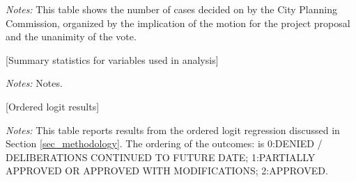 \documentclass[12pt,english,hyperfootnotes=false,hidelinks]{article}
\begin{document}
\begin{table}[H]
\caption{Summary of Motion Outcomes and Vote Results}
\vspace{0.2cm}
\label{tab_result_unanimity}
\begin{adjustbox}{max width=\textwidth}
\begin{threeparttable}

\begin{tablenotes}

\item {\textit{Notes: } This table shows the number of cases decided on by the City Planning Commission, organized by the implication of the motion for the project proposal and the unanimity of the vote.}
\end{tablenotes}
\end{threeparttable}
\end{adjustbox}
\end{table}

\pagebreak

\begin{table}[H]
\caption{Summary Statistics for Case Features}
\vspace{0.2cm}
\label{tab_summary_stats}
\begin{adjustbox}{max width=\textwidth}
\begin{threeparttable}
\begin{center}
[Summary statistics for variables used in analysis]
\end{center}
\begin{tablenotes}
\item {\textit{Notes: } Notes.}
\end{tablenotes}
\end{threeparttable}
\end{adjustbox}
\end{table}

\pagebreak

\begin{table}[H]
\caption{Ordered Logit Regression Results}
\vspace{0.2cm}
\label{tab_ologit_results}
\begin{adjustbox}{max width=\textwidth}
\begin{threeparttable}
\begin{center}
[Ordered logit results]

\end{center}
\begin{tablenotes}
\item {\textit{Notes: } This table reports results from the ordered logit regression discussed in Section \ref{sec_methodology}. The ordering of the outcomes: is 0:DENIED / DELIBERATIONS CONTINUED TO FUTURE DATE; 1:PARTIALLY APPROVED OR APPROVED WITH MODIFICATIONS; 2:APPROVED.}
\end{tablenotes}
\end{threeparttable}
\end{adjustbox}
\end{table}
\end{document}

